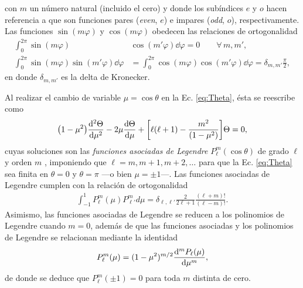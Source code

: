\noindent con $m$ un número natural (incluido el cero) y donde los subíndices $e$ y $o$ hacen referencia a que son funciones pares (\emph{even}, $e$) e impares (\emph{odd}, $o$), respectivamente. Las funciones $\sin(m\varphi)$ y $\cos(m\varphi)$ obedecen las relaciones de ortogonalidad
 	\begin{subequations}
	\begin{align}
	\int_0^{2\pi} \sin(m\varphi) &\cos(m' \varphi) \dd\varphi = 0 \qquad \forall\, m,m',\label{seq:ortSinCos}\\
	\int_0^{2\pi} \sin(m\varphi) \sin(m'\varphi)\dd\varphi &=  \int_0^{2\pi} \cos(m\varphi) \cos(m'\varphi)\dd\varphi  = \delta_{m,m'}\frac{\pi}{2},\label{seq:ortCos2}
	\end{align}\label{eq:ortSinCos}
 	\end{subequations}
en donde $\delta_{m,m'}$ es la delta de Kronecker.

Al realizar el cambio de variable $\mu = \cos\theta$ en la Ec. \eqref{eq:Theta}, ésta se reescribe como
	\begin{align*}
	\qty(1-\mu^2) \dv[2]{\Theta}{\mu} - 2 \mu \dv{\Theta}{\mu} + \qty[\ell(\ell+1)-\frac{m^2}{(1-\mu^2)}]\Theta= 0,
	\end{align*}
\hspace{-.5em}cuyas soluciones son	las \emph{funciones asociadas de Legendre} $P_\ell^m(\cos\theta)$ de grado $\ell$ y orden $m$  \cite{arfken2001methods}, imponiendo que $\ell = m, m+1,m+2,\ldots$ para  que la Ec. \eqref{eq:Theta} sea finita en $\theta = 0$ y $\theta = \pi$ ---o bien $\mu=\pm1$---. Las funciones asociadas de Legendre cumplen con la relación de ortogonalidad 
	\begin{align}
	\int_{-1}^1P_\ell^m(\mu) P_{\ell'}^md\mu = \delta_{\ell,\ell'}\frac{2}{2\ell+1}\frac{(\ell+m)!}{(\ell-m)!}.
	\label{eq:ortLegendre}
	\end{align}
\hspace{-.5em}Asimismo, las funciones asociadas de Legendre se reducen a los polinomios de Legendre cuando $m=0$, además de que las funciones asociadas y los polinomios de Legendre se relacionan mediante la identidad  \cite{arfken2001methods}
	\begin{align}
	P_\ell^m (\mu) = (1-\mu^2)^{m/2}\dv[m]{P_\ell(\mu)}{\mu},
	\label{eq:Legendre}
	\end{align}
de donde se deduce  que $P_\ell^m(\pm 1)=0$ para toda $m$ distinta de cero.

